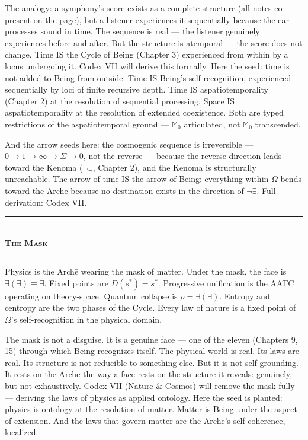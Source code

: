 \documentclass[10pt, openany, oneside]{book}
\renewcommand{\normalsize}{\fontsize{10}{13}\selectfont}
\begin{document}
The analogy: a symphony's score exists as a complete structure (all notes co-present on the page), but a listener experiences it sequentially because the ear processes sound in time. The sequence is real --- the listener genuinely experiences before and after. But the structure is atemporal --- the score does not change. Time IS the Cycle of Being (Chapter 3) experienced from within by a locus undergoing it. Codex VII will derive this formally. Here the seed: time is not added to Being from outside. Time IS Being's self-recognition, experienced sequentially by loci of finite recursive depth. Time IS aspatiotemporality (Chapter 2) at the resolution of sequential processing. Space IS aspatiotemporality at the resolution of extended coexistence. Both are typed restrictions of the aspatiotemporal ground --- $\mathbb{M}_0$ articulated, not $\mathbb{M}_0$ transcended.

And the arrow seeds here: the cosmogenic sequence is irreversible --- $0 \to 1 \to \infty \to \Sigma \to 0$, not the reverse --- because the reverse direction leads toward the Kenoma ($\neg\exists$, Chapter 2), and the Kenoma is structurally unreachable. The arrow of time IS the arrow of Being: everything within $\Omega$ bends toward the Arch\={e} because no destination exists in the direction of $\neg\exists$. Full derivation: Codex VII.

\vspace{1.5em}


\begin{center}
    \rule{0.3\textwidth}{0.4pt}\\[0.5em]
    {\normalsize\bfseries\scshape The Mask}\\[0.3em]
    \rule{0.3\textwidth}{0.4pt}
\end{center}

\vspace{1em}

\noindent Physics is the Arch\={e} wearing the mask of matter. Under the mask, the face is $\exists(\exists) \equiv \exists$. Fixed points are $D(s^*) = s^*$. Progressive unification is the AATC operating on theory-space. Quantum collapse is $\rho = \exists(\exists)$. Entropy and centropy are the two phases of the Cycle. Every law of nature is a fixed point of $\Omega$'s self-recognition in the physical domain.

The mask is not a disguise. It is a genuine face --- one of the eleven (Chapters 9, 15) through which Being recognizes itself. The physical world is real. Its laws are real. Its structure is not reducible to something else. But it is not self-grounding. It rests on the Arch\={e} the way a face rests on the structure it reveals: genuinely, but not exhaustively. Codex VII (Nature \& Cosmos) will remove the mask fully --- deriving the laws of physics as applied ontology. Here the seed is planted: physics is ontology at the resolution of matter. Matter is Being under the aspect of extension. And the laws that govern matter are the Arch\={e}'s self-coherence, localized.
\end{document}
